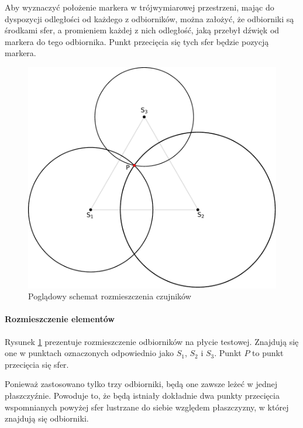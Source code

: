 Aby wyznaczyć położenie markera w trójwymiarowej przestrzeni, mając do dyspozycji odległości od każdego z odbiorników, można założyć, że odbiorniki są środkami sfer, a promieniem każdej z nich \ppauza odległość, jaką przebył dźwięk od markera do tego odbiornika. Punkt przecięcia się tych sfer będzie pozycją markera.

\begin{figure}
  \includegraphics[width=\textwidth]{gfx/diagramy/schemat_przeciecia_sfer}
  \caption{Poglądowy schemat rozmieszczenia czujników}
  \label{fig:schema_spheres}
\end{figure}

\paragraph{Rozmieszczenie elementów}
Rysunek \ref{fig:schema_spheres} prezentuje rozmieszczenie odbiorników na płycie testowej. Znajdują się one w punktach oznaczonych odpowiednio jako $S_1$, $S_2$ i $S_3$. Punkt $P$ to punkt przecięcia się sfer.

Ponieważ zastosowano tylko trzy odbiorniki, będą one zawsze leżeć w jednej płaszczyźnie. Powoduje to, że będą istniały dokładnie dwa punkty przecięcia wspomnianych powyżej sfer \ppauza lustrzane do siebie względem płaszczyzny, w której znajdują się odbiorniki.

